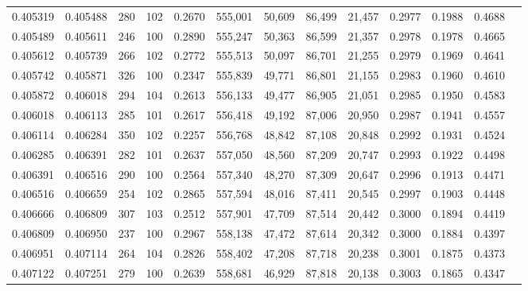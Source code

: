 \begin{tabular}{rrrrrrrrrrrrr}
0.405319 & 0.405488 &   280 & 102 &                                     0.2670 & 555,001 &  50,609 &  86,499 &  21,457 & 0.2977 & 0.1988 & 0.4688 \\
0.405489 & 0.405611 &   246 & 100 &                                     0.2890 & 555,247 &  50,363 &  86,599 &  21,357 & 0.2978 & 0.1978 & 0.4665 \\
0.405612 & 0.405739 &   266 & 102 &                                     0.2772 & 555,513 &  50,097 &  86,701 &  21,255 & 0.2979 & 0.1969 & 0.4641 \\
0.405742 & 0.405871 &   326 & 100 &                                     0.2347 & 555,839 &  49,771 &  86,801 &  21,155 & 0.2983 & 0.1960 & 0.4610 \\
0.405872 & 0.406018 &   294 & 104 &                                     0.2613 & 556,133 &  49,477 &  86,905 &  21,051 & 0.2985 & 0.1950 & 0.4583 \\
0.406018 & 0.406113 &   285 & 101 &                                     0.2617 & 556,418 &  49,192 &  87,006 &  20,950 & 0.2987 & 0.1941 & 0.4557 \\
0.406114 & 0.406284 &   350 & 102 &                                     0.2257 & 556,768 &  48,842 &  87,108 &  20,848 & 0.2992 & 0.1931 & 0.4524 \\
0.406285 & 0.406391 &   282 & 101 &                                     0.2637 & 557,050 &  48,560 &  87,209 &  20,747 & 0.2993 & 0.1922 & 0.4498 \\
0.406391 & 0.406516 &   290 & 100 &                                     0.2564 & 557,340 &  48,270 &  87,309 &  20,647 & 0.2996 & 0.1913 & 0.4471 \\
0.406516 & 0.406659 &   254 & 102 &                                     0.2865 & 557,594 &  48,016 &  87,411 &  20,545 & 0.2997 & 0.1903 & 0.4448 \\
0.406666 & 0.406809 &   307 & 103 &                                     0.2512 & 557,901 &  47,709 &  87,514 &  20,442 & 0.3000 & 0.1894 & 0.4419 \\
0.406809 & 0.406950 &   237 & 100 &                                     0.2967 & 558,138 &  47,472 &  87,614 &  20,342 & 0.3000 & 0.1884 & 0.4397 \\
0.406951 & 0.407114 &   264 & 104 &                                     0.2826 & 558,402 &  47,208 &  87,718 &  20,238 & 0.3001 & 0.1875 & 0.4373 \\
0.407122 & 0.407251 &   279 & 100 &                                     0.2639 & 558,681 &  46,929 &  87,818 &  20,138 & 0.3003 & 0.1865 & 0.4347 \\

\end{tabular}
